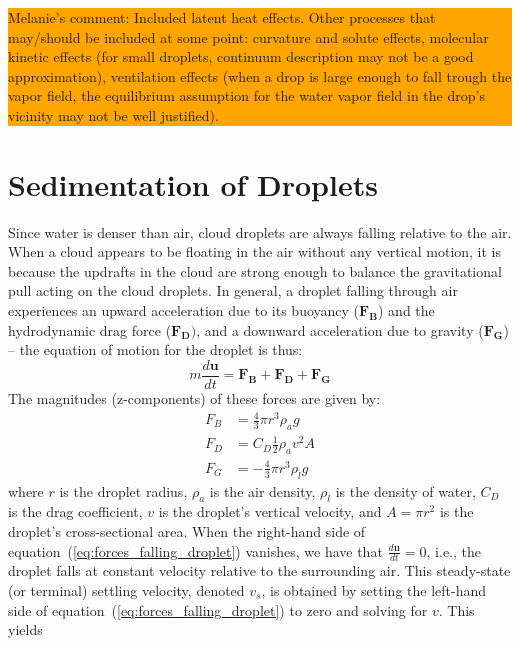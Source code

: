 \documentclass{report}
\begin{document}
\colorbox{orange}{\parbox{12cm}{Melanie's comment: Included latent heat effects. Other processes that may/should be included at some point: curvature and solute effects, molecular kinetic effects (for small droplets, continuum description may not be a good approximation), ventilation effects (when a drop is large enough to fall trough the vapor field, the equilibrium assumption for the water vapor field in the drop's vicinity may not be well justified).}}


\section{Sedimentation of Droplets}
\label{sec:sedimentation}
Since water is denser than air, cloud droplets are always falling relative to the air. When a cloud appears to be floating in the air without any vertical motion, it is because the updrafts in the cloud are strong enough to balance the gravitational pull acting on the cloud droplets.
In general, a droplet falling through air experiences an upward acceleration due to its buoyancy ($\mathbf{F_B}$) and the hydrodynamic drag force ($\mathbf{F_D})$, and a downward acceleration due to gravity ($\mathbf{F_G}$) -- the equation of motion for the droplet is thus:
\begin{equation}
    m\frac{d\mathbf{u}}{dt} = \mathbf{F_B} + \mathbf{F_D} + \mathbf{F_G}
\label{eq:forces_falling_droplet}
\end{equation}
The magnitudes (z-components) of these forces are given by:
\begin{equation}
\begin{aligned}
    F_B &= \frac{4}{3} \pi r^3 \rho_a g \\
    F_D &= C_D \frac{1}{2} \rho_a v^2 A \\
    F_G &= -\frac{4}{3} \pi r^3 \rho_l g
\label{eq:forces_definitions}
\end{aligned}
\end{equation}
where $r$ is the droplet radius, $\rho_a$ is the air density, $\rho_l$ is the density of water, $C_D$ is the drag coefficient, $v$ is the droplet's vertical velocity, and $A = \pi r^2$ is the droplet's cross-sectional area.
When the right-hand side of equation~(\ref{eq:forces_falling_droplet}) vanishes, we have that $\frac{d\mathbf{u}}{dt} = 0$, i.e., the droplet falls at constant velocity relative to the surrounding air. This steady-state (or terminal) settling  velocity, denoted $v_s$, is obtained by setting the left-hand side of equation~(\ref{eq:forces_falling_droplet}) to zero and solving for $v$. This yields
\end{document}
